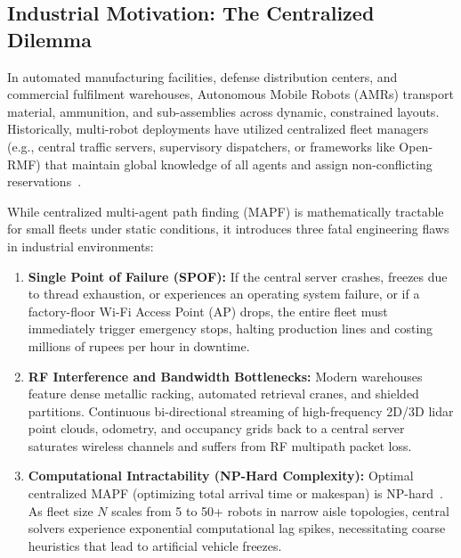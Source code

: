 \documentclass[10pt,twocolumn,a4paper]{article}
\theoremstyle{definition}
\begin{document}
\subsection{Industrial Motivation: The Centralized Dilemma}
In automated manufacturing facilities, defense distribution centers, and commercial fulfilment warehouses, Autonomous Mobile Robots (AMRs) transport material, ammunition, and sub-assemblies across dynamic, constrained layouts. Historically, multi-robot deployments have utilized centralized fleet managers (e.g., central traffic servers, supervisory dispatchers, or frameworks like Open-RMF) that maintain global knowledge of all agents and assign non-conflicting reservations~\cite{macenski2020nav2, quigley2009ros}.

While centralized multi-agent path finding (MAPF) is mathematically tractable for small fleets under static conditions, it introduces three fatal engineering flaws in industrial environments:
\begin{enumerate}
    \item \textbf{Single Point of Failure (SPOF):} If the central server crashes, freezes due to thread exhaustion, or experiences an operating system failure, or if a factory-floor Wi-Fi Access Point (AP) drops, the entire fleet must immediately trigger emergency stops, halting production lines and costing millions of rupees per hour in downtime.
    \item \textbf{RF Interference and Bandwidth Bottlenecks:} Modern warehouses feature dense metallic racking, automated retrieval cranes, and shielded partitions. Continuous bi-directional streaming of high-frequency 2D/3D lidar point clouds, odometry, and occupancy grids back to a central server saturates wireless channels and suffers from RF multipath packet loss.
    \item \textbf{Computational Intractability (NP-Hard Complexity):} Optimal centralized MAPF (optimizing total arrival time or makespan) is NP-hard~\cite{yu2013planning}. As fleet size $N$ scales from 5 to 50+ robots in narrow aisle topologies, central solvers experience exponential computational lag spikes, necessitating coarse heuristics that lead to artificial vehicle freezes.
\end{enumerate}
\end{document}
